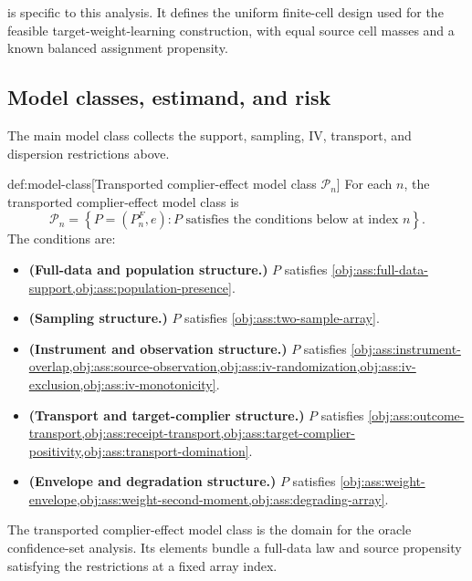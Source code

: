 \documentclass[11pt]{article}
\begin{document}
 is specific to this analysis. It defines the uniform finite-cell design used for the feasible target-weight-learning construction, with equal source cell masses and a known balanced assignment propensity.

\subsection{Model classes, estimand, and risk}

The main model class collects the support, sampling, IV, transport, and dispersion restrictions above.

\begin{definitionv}{def:model-class}[Transported complier-effect model class \(\mathcal P_n\)]
For each \(n\), the transported complier-effect model class is
\[
\mathcal P_n
=
\left\{
P=(P_n^F,e):
P \text{ satisfies the conditions below at index } n
\right\}.
\]
The conditions are:
\begin{itemize}
\item \textbf{(Full-data and population structure.)} \(P\) satisfies \cref{obj:ass:full-data-support,obj:ass:population-presence}.
\item \textbf{(Sampling structure.)} \(P\) satisfies \cref{obj:ass:two-sample-array}.
\item \textbf{(Instrument and observation structure.)} \(P\) satisfies \cref{obj:ass:instrument-overlap,obj:ass:source-observation,obj:ass:iv-randomization,obj:ass:iv-exclusion,obj:ass:iv-monotonicity}.
\item \textbf{(Transport and target-complier structure.)} \(P\) satisfies \cref{obj:ass:outcome-transport,obj:ass:receipt-transport,obj:ass:target-complier-positivity,obj:ass:transport-domination}.
\item \textbf{(Envelope and degradation structure.)} \(P\) satisfies \cref{obj:ass:weight-envelope,obj:ass:weight-second-moment,obj:ass:degrading-array}.
\end{itemize}
\end{definitionv}

The transported complier-effect model class  is the domain for the oracle confidence-set analysis. Its elements bundle a full-data law and source propensity satisfying the restrictions at a fixed array index.
\end{document}

